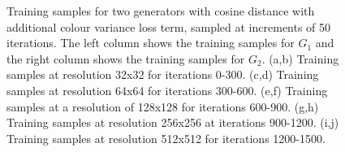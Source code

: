 \begin{figure}[!htbp]
    \hfill
    \hfill
    \hfill
    \hfill
    \hfill
    \hfill
    \caption[Training samples for two generators with cosine distance with additional colour variance loss term]{Training samples for two generators with cosine distance with additional colour variance loss term, sampled at increments of 50 iterations. The left column shows the training samples for $G_{1}$ and the right column shows the training samples for $G_{2}$. (a,b) Training samples at resolution 32x32 for iterations 0-300. (c,d) Training samples at resolution 64x64 for iterations 300-600. (e,f) Training samples at a resolution of 128x128 for iterations 600-900. (g,h) Training samples at resolution 256x256 at iterations 900-1200. (i,j) Training samples at resolution 512x512 for iterations 1200-1500.}
    \label{fig:c3:samples-cos-cos}
  \end{figure}

